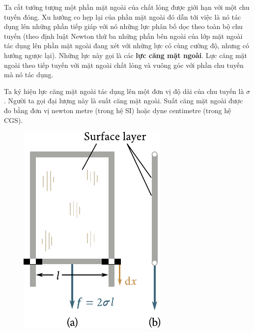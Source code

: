 
Ta cắt tưởng tượng một phần mặt ngoài của chất lỏng được giới hạn vởi một chu tuyến đóng. Xu hướng co hẹp lại của phần mặt ngoài đó dẫn tới việc là nó tác dụng lên những phần tiếp giáp với nó những lực phân bố dọc theo toàn bộ chu tuyến (theo định luật Newton thứ ba những phần bên ngoài của lớp mặt ngoài tác dụng lên phần mặt ngoài đang xét với những lực có cùng cường độ, nhưng có hướng ngược lại). Những lực này gọi là các \textbf{lực căng mặt ngoài}. Lực căng mặt ngoài theo tiếp tuyến với mặt ngoài chất lỏng và vuông góc với phần chu tuyến mà nó tác dụng.


Ta ký hiệu lực căng mặt ngoài tác dụng lên một đơn vị độ dài của chu tuyến là $\sigma$. Người ta gọi đại lượng này là suất căng mặt ngoài. Suất căng mặt ngoài được đo bằng đơn vị newton metre (trong hệ SI) hoặc dyne centimetre (trong hệ CGS).

\begin{figure}[!htb]
	\begin{center}
		\includegraphics[scale=1.1]{figures/ch_14/fig_14_2.pdf}
		\caption[]{}
		\label{fig:14_2}
	\end{center}
	\vspace{-0.8cm}
\end{figure}

